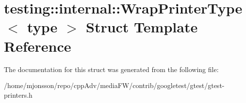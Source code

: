 \hypertarget{structtesting_1_1internal_1_1WrapPrinterType}{}\section{testing\+:\+:internal\+:\+:Wrap\+Printer\+Type$<$ type $>$ Struct Template Reference}
\label{structtesting_1_1internal_1_1WrapPrinterType}


The documentation for this struct was generated from the following file\+:\begin{DoxyCompactItemize}
\item 
/home/mjonsson/repo/cpp\+Adv/media\+F\+W/contrib/googletest/gtest/gtest-\/printers.\+h\end{DoxyCompactItemize}
